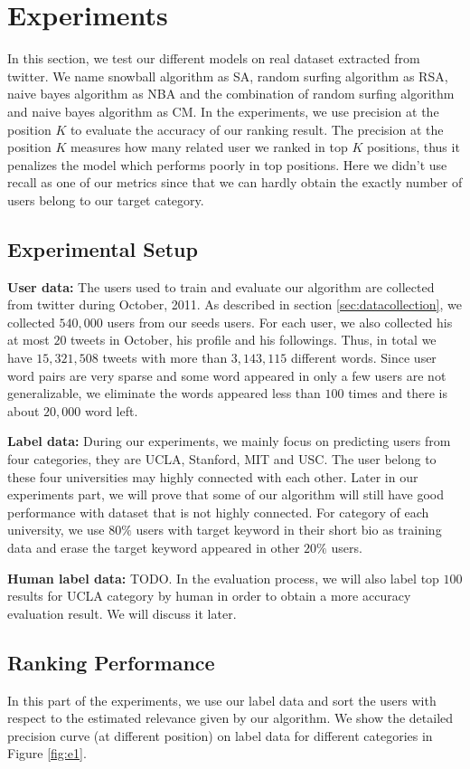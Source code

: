 \documentclass{article}
\begin{document}
\section{Experiments}\label{sec:experiment}
In this section, we test our different models on real dataset extracted from twitter. We name snowball algorithm as SA, random surfing algorithm as RSA, naive bayes algorithm as NBA and the combination of random surfing algorithm and naive bayes algorithm as CM. In the experiments, we use precision at the position $K$ to evaluate the accuracy of our ranking result. The precision at the position $K$ measures how many related user we ranked in top $K$ positions, thus it penalizes the model which performs poorly in top positions. Here we didn't use recall as one of our metrics since that we can hardly obtain the exactly number of users belong to our target category.

\subsection{Experimental Setup}
\textbf{User data:} The users used to train and evaluate our algorithm are collected from twitter during October, 2011. As described in section \ref{sec:datacollection}, we collected $540,000$ users from our seeds users. For each user, we also collected his at most $20$ tweets in October, his profile and his followings. Thus, in total we have $15,321,508$ tweets with more than $3,143,115$ different words. Since user word pairs are very sparse and some word appeared in only a few users are not generalizable, we eliminate the words appeared less than $100$ times and there is about $20,000$ word left.

\textbf{Label data:} During our experiments, we mainly focus on predicting users from four categories, they are UCLA, Stanford, MIT and USC. The user belong to these four universities may highly connected with each other. Later in our experiments part, we will prove that some of our algorithm will still have good performance with dataset that is not highly connected. For category of each university, we use $80\%$ users with target keyword in their short bio as training data and erase the target keyword appeared in other $20\%$ users.

\textbf{Human label data:} TODO. In the evaluation process, we will also label top $100$ results for UCLA category by human in order to obtain a more accuracy evaluation result. We will discuss it later.

\subsection{Ranking Performance}
In this part of the experiments, we use our label data and sort the users with respect to the estimated relevance given by our algorithm. We show the detailed precision curve (at different position) on label data for different categories in Figure \ref{fig:e1}.
\end{document}
